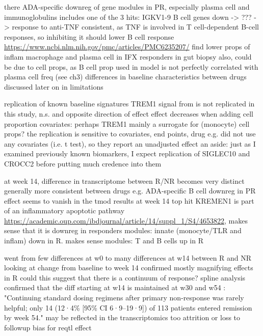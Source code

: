 \begin{outline}
\1 there ADA-specific downreg of gene modules in PR, especially plasma cell and immunoglobulins
    \2 includes one of the 3 hits: IGKV1-9
    \2 B cell genes down -> ??? -> response to anti-TNF
        \3 consistent, as TNF is involved in T cell-dependent B-cell responses, so inhibiting it should lower B cell response \url{https://www.ncbi.nlm.nih.gov/pmc/articles/PMC6235207/}
    \2 \textcite{gaujoux2019CellcentredMetaanalysisReveals} find lower props of inflam macrophage and plasma cell in IFX responders in gut biopsy
    \2 also, could be due to cell props, as B cell prop used in model is not perfectly correlated with plasma cell freq (see ch3)
    \2 differences in baseline characteristics between drugs discussed later on in limitations

\1 replication of known baseline signatures
    \2 TREM1 signal from \textcite{verstockt2019LowTREM1Expression} is not replicated in this study, n.s. and opposite direction of effect
    \2 effect decreases when adding cell proportion covariates: perhaps TREM1 mainly a surrogate for (monocyte) cell props?
    \2 the replication is sensitive to covariates, end points, drug
        \3 e.g. \textcite{verstockt2019LowTREM1Expression} did not use any covariates (i.e. t test), so they report an unadjusted effect
    \2 an aside: just as I examined previously known biomarkers, I expect replication of SIGLEC10 and CROCC2 before putting much credence into them

\1 at week 14, difference in transcriptome between R/NR becomes very distinct
    \2 generally more consistent between drugs
        \3 e.g. ADA-specific B cell downreg in PR effect seems to vanish in the tmod results at week 14
    \2 top hit KREMEN1 is part of an inflammatory apoptotic pathway \url{https://academic.oup.com/ibdjournal/article/14/suppl_1/S4/4653822}, makes sense that it is downreg in responders
    \2 modules: innate (monocyte/TLR and inflam) down in R. makes sense
    \2 modules: T and B cells up in R 

\1 went from few differences at w0 to many differences at w14 between R and NR
    \2 looking at change from baseline to week 14 confirmed mostly magnifying effects in R
        \3 could this suggest that there is a continuum of response?
    \2 spline analysis confirmed that the diff starting at w14 is maintained at w30 and w54
    \2 \autocite{kennedy2019PredictorsAntiTNFTreatment}: "Continuing standard dosing regimens after primary non-response was rarely helpful; only 14 (12·4\% [95\% CI 6·9–19·9]) of 113 patients entered remission by week 54."
        \3 may be reflected in the transcriptomics too
    \2 attrition or loss to followup bias for reqtl effect


\end{outline}
